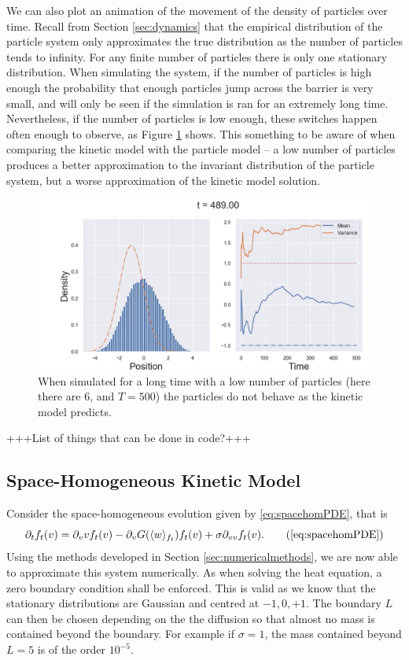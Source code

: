 We can also plot an animation of the movement of the density of particles over time. Recall from Section \ref{sec:dynamics} that the empirical distribution of the particle system only approximates the true distribution as the number of particles tends to infinity. For any finite number of particles there is only one stationary distribution. When simulating the system, if the number of particles is high enough the probability that enough particles jump across the barrier is very small, and will only be seen if the simulation is ran for an extremely long time. Nevertheless, if the number of particles is low enough, these switches happen often enough to observe, as Figure \ref{fig:switch} shows. This something to be aware of when comparing the kinetic model with the particle model -- a low number of particles produces a better approximation to the invariant distribution of the particle system, but a worse approximation of the kinetic model solution.

\begin{figure}
    \centering
    \includegraphics[width=\linewidth]{Figures/switch}
    \caption[Mean Zero Invariant Measure for the Particle System]{When simulated for a long time with a low number of particles (here there are 6, and $T=500$) the particles do not behave as the kinetic model predicts.}
    \label{fig:switch}
\end{figure}

+++List of things that can be done in code?+++

\subsection{Space-Homogeneous Kinetic Model}\label{sec:homkin}
 Consider the space-homogeneous evolution given by \eqref{eq:spacehomPDE}, that is
    \begin{equation}
    \partial_t f_t(v) = \partial_v vf_t(v) - \partial_v G(\langle w \rangle_{f_t})f_t(v) + \sigma \partial_{vv} f_t(v).\tag{\ref{eq:spacehomPDE}}
    \end{equation}
    Using the methods developed in Section \ref{sec:numericalmethods}, we are now able to approximate this system numerically. As when solving the heat equation, a zero boundary condition shall be enforced. This is valid as we know that the stationary distributions are Gaussian and centred at $-1,0,+1$. The boundary $L$ can then be chosen depending on the the diffusion so that almost no mass is contained beyond the boundary. For example if $\sigma = 1$, the mass contained beyond $L=5$ is of the order $10^{-5}$. 
    
